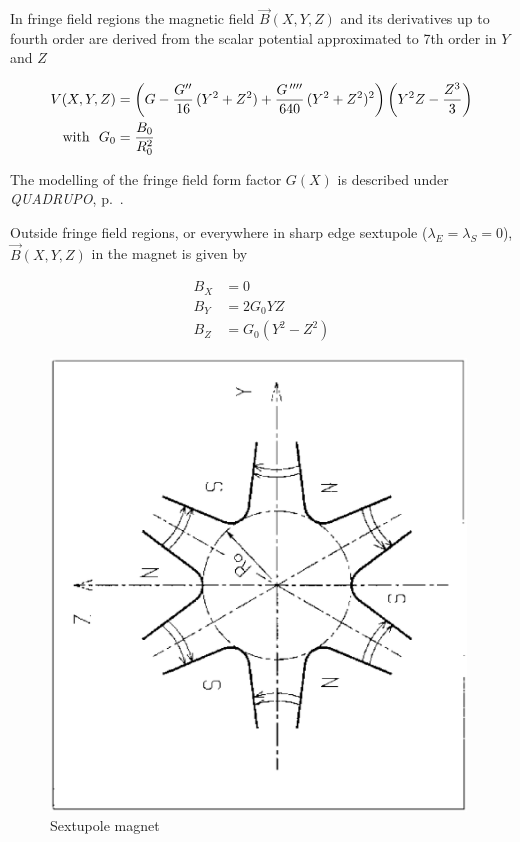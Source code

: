 \noindent In fringe field regions the magnetic field $ \vec  B(X,Y,Z) $ and
its derivatives up to fourth order are derived from the scalar potential approximated to 
7th order in $ Y $ and $ Z $

 \begin{align*}
 	V(X,Y,Z)    & =   \left(G- \dfrac{G^{\prime\prime} }{ 16}\, (Y^2+Z^2)+
	             \dfrac{G^{\,\prime\prime\prime\prime} }{ 640}\, (Y^2+Z^2)^2\right) 
	             \left(Y^2Z-\dfrac{Z^3 }{ 3} \right)   \\
\text{with } ~ G_0 &   =  \dfrac{ B_0}{ R^2_0}
\end{align*}

\noindent The  modelling of the fringe field form factor  $G(X)$
 is described under \textsl{QUADRUPO}, p.~\pageref{QUADRUPO}. 

\medskip


\noindent Outside fringe field regions, or everywhere in sharp edge sextupole 
($ \lambda_E=\lambda_ S=0$),   $ \vec  B(X,Y,Z) $ in the magnet is given by 

\begin{align*}
	B_X &   =     0 \\
	B_Y &   =    2G_0YZ \\
	B_Z &   =     G_0(Y^2-Z^2)  
\end{align*}
\vfill

\begin{figure}[H]
\centerline{\includegraphics[height=12cm,angle=-90]{Fig29.ps}}
\caption{\label{fig29}Sextupole magnet}
\end{figure}
\vfill



